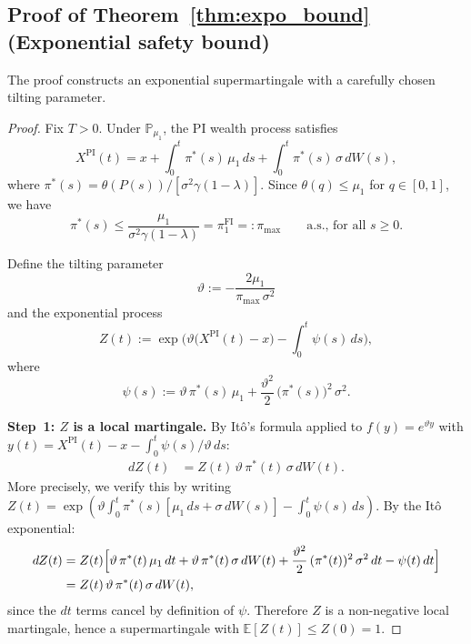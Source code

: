 \documentclass[12pt]{article}
\theoremstyle{remark}
\theoremstyle{definition}
\newcommand{\E}{\mathbb{E}}
\newcommand{\Prob}{\mathbb{P}}
\newcommand{\FI}{\mathrm{FI}}
\newcommand{\PI}{\mathrm{PI}}
\begin{document}
\subsection{Proof of Theorem~\ref{thm:expo_bound}
  (Exponential safety bound)}
\label{sec:proof_expo}

The proof constructs an exponential supermartingale with a carefully
chosen tilting parameter.

\begin{proof}
Fix $T > 0$.
Under $\Prob_{\mu_1}$, the PI wealth process satisfies
\begin{equation}\label{eq:XPI_drift}
  X^{\PI}(t) = x + \int_0^t \pi^*(s)\,\mu_1\,ds
             + \int_0^t \pi^*(s)\,\sigma\,dW(s),
\end{equation}
where $\pi^*(s) = \theta(P(s))/[\sigma^2\gamma(1-\lambda)]$.
Since $\theta(q) \le \mu_1$ for $q \in [0,1]$, we have
\begin{equation}\label{eq:pi_upper}
  \pi^*(s) \le \frac{\mu_1}{\sigma^2\gamma(1-\lambda)}
  = \pi_1^{\FI} =: \pi_{\max}
  \qquad \text{a.s., for all } s \ge 0.
\end{equation}

Define the tilting parameter
\begin{equation}\label{eq:theta_tilt}
  \vartheta := -\frac{2\mu_1}{\pi_{\max}\,\sigma^2}
\end{equation}
and the exponential process
\begin{equation}\label{eq:Z_process}
  Z(t) := \exp\!\biggl(
    \vartheta\bigl(X^{\PI}(t) - x\bigr)
    - \int_0^t \psi(s)\,ds
  \biggr),
\end{equation}
where
\begin{equation}\label{eq:psi_def}
  \psi(s) := \vartheta\,\pi^*(s)\,\mu_1
           + \frac{\vartheta^2}{2}\,\bigl(\pi^*(s)\bigr)^2\,\sigma^2.
\end{equation}

\medskip
\noindent\textbf{Step~1: $Z$ is a local martingale.}
By It\^o's formula applied to $f(y) = e^{\vartheta y}$ with
$y(t) = X^{\PI}(t) - x - \int_0^t \psi(s)/\vartheta\,ds$:
\begin{align}
  dZ(t)
  &= Z(t)\,\vartheta\,\pi^*(t)\,\sigma\,dW(t). \label{eq:dZ}
\end{align}
More precisely, we verify this by writing
$Z(t) = \exp(\vartheta\int_0^t \pi^*(s)[\mu_1\,ds + \sigma\,dW(s)]
  - \int_0^t \psi(s)\,ds)$.
By the It\^o exponential:
\begin{align*}
  dZ(t)
  &= Z(t)\Bigl[\vartheta\,\pi^*(t)\,\mu_1\,dt
    + \vartheta\,\pi^*(t)\,\sigma\,dW(t)
    + \frac{\vartheta^2}{2}\,(\pi^*(t))^2\,\sigma^2\,dt
    - \psi(t)\,dt\Bigr] \\
  &= Z(t)\,\vartheta\,\pi^*(t)\,\sigma\,dW(t),
\end{align*}
since the $dt$ terms cancel by definition of $\psi$.
Therefore $Z$ is a non-negative local martingale, hence a
supermartingale with $\E[Z(t)] \le Z(0) = 1$.


\end{proof}
\end{document}
